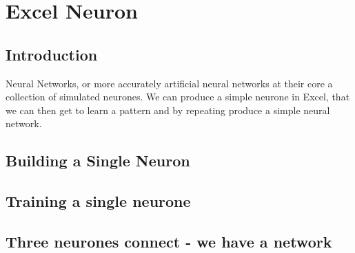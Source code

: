 \chapter{Excel Neuron}
\section{Introduction}
Neural Networks, or more accurately artificial neural networks at their core a collection of simulated neurones. We can produce a simple neurone in Excel, that we can then get to learn a pattern and by repeating produce a simple neural network.

\section{Building a Single Neuron}

\section{Training a single neurone}

\section{Three neurones connect - we have a network}